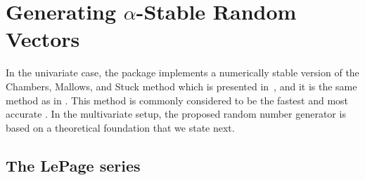 
\section{Generating $\alpha$-Stable Random Vectors}

In the univariate case, the package implements a numerically stable version of the Chambers, Mallows, and Stuck method which is presented in~\cite{NolanJohnP2020USDM,WERON1996165}, and it is the same method as in \cite{Royuela-del-ValJavier2017l:FP,teimouri2018alphastablerpackagemodelling}. This method is commonly considered to be the fastest and most accurate \citep{Weron2004Computationally}. In the multivariate setup, the proposed random number generator is based on a theoretical foundation that we state next.

\subsection{The LePage series}

